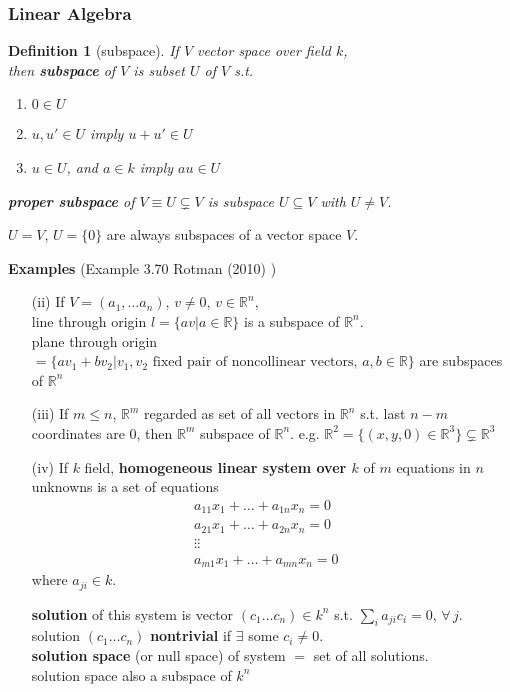 \documentclass[10pt]{amsart}
\newtheorem{definition}{Definition}
\begin{document}
\begin{multicols*}{2}
\subsubsection{Linear Algebra}

\begin{definition}[subspace]
	If $V$ vector space over field $k$, \\
	then \textbf{subspace} of $V$ is subset $U$ of $V$ s.t. 
	\begin{enumerate}
		\item $0\in U$
		\item $u,u' \in U$ imply $u+u' \in U$ 
		\item $u\in U$, and $a\in k$ imply $au \in U$
	\end{enumerate}
	\textbf{proper subspace} of $V \equiv U \subsetneq V$ is subspace $U \subseteq V$ with $U \neq V$.
\end{definition}
$U =V$, $U = \lbrace 0 \rbrace$ are always subspaces of a vector space $V$. 

\textbf{Examples} (Example 3.70 Rotman (2010) \cite{JRotman2010}) 
\begin{enumerate}
	\item[(ii)] If $V=(a_1, \dots a_n)$, $v\neq 0$, $v\in \mathbb{R}^n$, \\
	line through origin $l = \lbrace av | a \in \mathbb{R} \rbrace$ is a subspace of $\mathbb{R}^n$. \\
	plane through origin $=\lbrace av_1 + bv_2 | v_1 , v_2 \text{ fixed pair of noncollinear vectors, } a,b \in \mathbb{R} \rbrace$ are subspaces of $\mathbb{R}^n$
	\item[(iii)] If $m\leq n$, $\mathbb{R}^m$ regarded as set of all vectors in $\mathbb{R}^n$ s.t. last $n-m$ coordinates are $0$, then $\mathbb{R}^m$ subspace of $\mathbb{R}^n$.
	e.g. $\mathbb{R}^2 = \lbrace (x,y,0) \in \mathbb{R}^3 \rbrace \subsetneq \mathbb{R}^3$
	\item[(iv)] If $k$ field, \textbf{homogeneous linear system over $k$ } of $m$ equations in $n$ unknowns is a set of equations
	\[
	\begin{aligned}
	a_{11} x_1 + \dots + a_{1n} x_n = 0 & \\
	a_{21} x_1 + \dots + a_{2n} x_n = 0 & \\
	\vdots \vdots & \\
		a_{m1} x_1 + \dots + a_{mn} x_n = 0 & 
	\end{aligned}
	\] 
	where $a_{ji} \in k$.
	
	\textbf{solution} of this system is vector $(c_1 \dots c_n) \in k^n$ s.t. $\sum_i a_{ji} c_i  =0$, $\forall \, j$. \\
	solution $(c_1 \dots c_n)$ \textbf{nontrivial} if $\exists$ some $c_i \neq 0$. \\
	\textbf{solution space} (or null space) of system $=$ set of all solutions. \\
	solution space also a subspace of $k^n$
\end{enumerate}


\end{multicols*}
\end{document}

